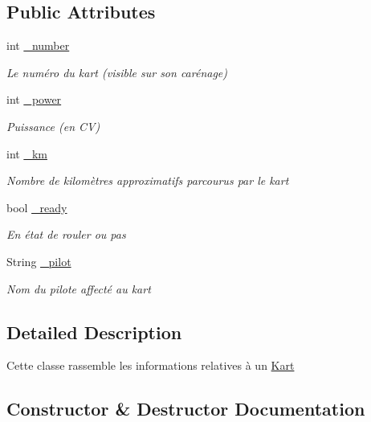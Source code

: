 \subsection*{Public Attributes}
\begin{DoxyCompactItemize}
\item 
int \hyperlink{class_race_1_1_kart_af7860f4c88d687a5a8d22151592c8974}{\+\_\+number}
\begin{DoxyCompactList}\small\item\em Le numéro du kart (visible sur son carénage) \end{DoxyCompactList}\item 
int \hyperlink{class_race_1_1_kart_a2e90dc684349a0ccd2de96b1faefd043}{\+\_\+power}
\begin{DoxyCompactList}\small\item\em Puissance (en C\+V) \end{DoxyCompactList}\item 
int \hyperlink{class_race_1_1_kart_aa337dad391a2a169388551993ab4d1ab}{\+\_\+km}
\begin{DoxyCompactList}\small\item\em Nombre de kilomètres approximatifs parcourus par le kart \end{DoxyCompactList}\item 
bool \hyperlink{class_race_1_1_kart_ae491a61fdfac43fb31a83c85c316d13a}{\+\_\+ready}
\begin{DoxyCompactList}\small\item\em En état de rouler ou pas \end{DoxyCompactList}\item 
String \hyperlink{class_race_1_1_kart_a95bf9b72640a0f73e19837376861184f}{\+\_\+pilot}
\begin{DoxyCompactList}\small\item\em Nom du pilote affecté au kart \end{DoxyCompactList}\end{DoxyCompactItemize}


\subsection{Detailed Description}
Cette classe rassemble les informations relatives à un \hyperlink{class_race_1_1_kart}{Kart} 



\subsection{Constructor \& Destructor Documentation}
\hypertarget{class_race_1_1_kart_aa6be2409a32a5c0a15e75a80af1f51f5}{}
